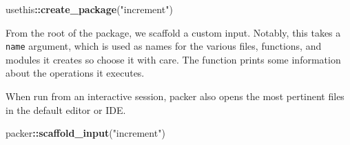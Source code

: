 \documentclass[10pt,]{krantz}
\makeatletter
\newenvironment{Shaded}{\begin{snugshade}}{\end{snugshade}}
\newcommand{\KeywordTok}[1]{\textcolor[rgb]{0.27,0.27,0.27}{\textbf{#1}}}
\newcommand{\NormalTok}[1]{#1}
\newcommand{\OperatorTok}[1]{\textcolor[rgb]{0.43,0.43,0.43}{\textbf{#1}}}
\newcommand{\StringTok}[1]{\textcolor[rgb]{0.5,0.5,0.5}{#1}}
\newenvironment{kframe}{%
\medskip{}
\setlength{\fboxsep}{.8em}
 \def\at@end@of@kframe{}%
 \ifinner\ifhmode%
  \def\at@end@of@kframe{\end{minipage}}%
  \begin{minipage}{\columnwidth}%
 \fi\fi%
 \def\FrameCommand##1{\hskip\@totalleftmargin \hskip-\fboxsep
 \colorbox{shadecolor}{##1}\hskip-\fboxsep
     \hskip-\linewidth \hskip-\@totalleftmargin \hskip\columnwidth}%
 \MakeFramed {\advance\hsize-\width
   \@totalleftmargin\z@ \linewidth\hsize
   \@setminipage}}%
 {\par\unskip\endMakeFramed%
 \at@end@of@kframe}
\renewenvironment{Shaded}{\begin{kframe}}{\end{kframe}}
\makeatother
\begin{document}
\begin{Shaded}
\begin{Highlighting}[]
\NormalTok{usethis}\OperatorTok{::}\KeywordTok{create_package}\NormalTok{(}\StringTok{"increment"}\NormalTok{)}
\end{Highlighting}
\end{Shaded}

From the root of the package, we scaffold a custom input. Notably, this takes a \texttt{name} argument, which is used as names for the various files, functions, and modules it creates so choose it with care. The function prints some information about the operations it executes.

When run from an interactive session, packer also opens the most pertinent files in the default editor or IDE.

\begin{Shaded}
\begin{Highlighting}[]
\NormalTok{packer}\OperatorTok{::}\KeywordTok{scaffold_input}\NormalTok{(}\StringTok{"increment"}\NormalTok{)}
\end{Highlighting}
\end{Shaded}
\end{document}
